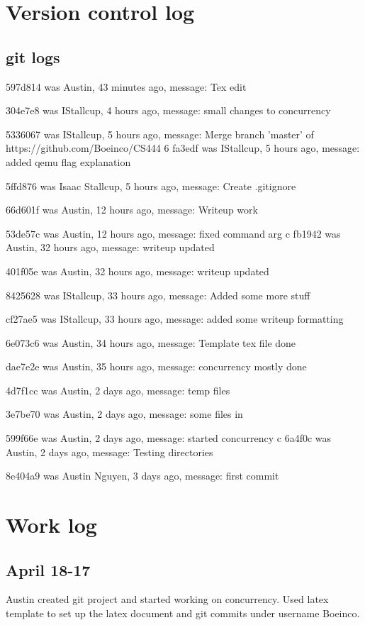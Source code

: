 \documentclass[letterpaper,10pt,titlepage]{article}
\begin{document}
\section{Version control log}
\begin{versionhistory}
\subsection{git logs}
597d814 was Austin, 43 minutes ago, message: Tex edit

304e7e8 was IStallcup, 4 hours ago, message: small changes to concurrency

5336067 was IStallcup, 5 hours ago, message: Merge branch 'master' of https://github.com/Boeinco/CS444
6
fa3edf was IStallcup, 5 hours ago, message: added qemu flag explanation

5ffd876 was Isaac Stallcup, 5 hours ago, message: Create .gitignore

66d601f was Austin, 12 hours ago, message: Writeup work

53de57c was Austin, 12 hours ago, message: fixed command arg
c
fb1942 was Austin, 32 hours ago, message: writeup updated

401f05e was Austin, 32 hours ago, message: writeup updated

8425628 was IStallcup, 33 hours ago, message: Added some more stuff

cf27ae5 was IStallcup, 33 hours ago, message: added some writeup formatting

6e073c6 was Austin, 34 hours ago, message: Template tex file done

dae7e2e was Austin, 35 hours ago, message: concurrency mostly done

4d7f1cc was Austin, 2 days ago, message: temp files

3e7be70 was Austin, 2 days ago, message: some files in

599f66e was Austin, 2 days ago, message: started concurrency
c
6a4f0c was Austin, 2 days ago, message: Testing directories

8e404a9 was Austin Nguyen, 3 days ago, message: first commit

\end{versionhistory}

\section{Work log}
\subsection{April 18-17}
Austin created git project and started working on concurrency.  Used latex template to set up the latex document and git commits under username Boeinco.
\end{document}
